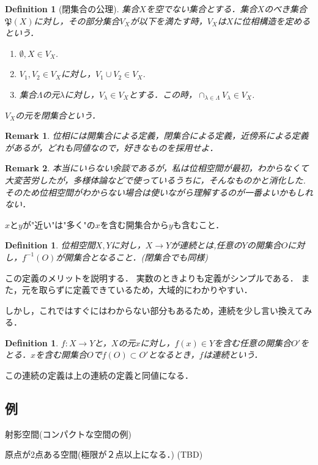 \documentclass{ujarticle}
\newtheorem{dfn}[thm]{Definition}
\newtheorem*{rem}{Remark}
\begin{document}
\begin{dfn}[閉集合の公理]
 集合$X$を空でない集合とする．集合$X$のべき集合$\mathfrak{P}(X)$に対し，その部分集合$V_X$が以下を満たす時，$V_X$は$X$に位相構造を定めるという．
 \begin{enumerate}
   \item $\emptyset , X \in V_X$.
   \item $V_1,V_2 \in V_X$に対し，$V_1 \cup V_2 \in V_X$.
   \item 集合$\Lambda$の元$\lambda$に対し，$V_{\lambda} \in V_X$とする．この時，$\displaystyle \cap_{\lambda \in \Lambda}V_{\lambda} \in V_X$.
 \end{enumerate}
 $V_X$の元を閉集合という．
\end{dfn}

\begin{rem}
位相には開集合による定義，閉集合による定義，近傍系による定義があるが，どれも同値なので，好きなものを採用せよ．
\end{rem}
\begin{rem}
 本当にいらない余談であるが，私は位相空間が最初，わからなくて大変苦労したが，多様体論などで使っているうちに，そんなものかと消化した.そのため位相空間がわからない場合は使いながら理解するのが一番よいかもしれない．
\end{rem}

$x$と$y$が"近い"は"多く"の$x$を含む開集合から$y$も含むこと．

\begin{dfn}
 位相空間$X,Y$に対し，$X \to Y$が連続とは,任意の$Y$の開集合$O$に対し，$f^{-1}(O)$が開集合となること．(閉集合でも同様)
\end{dfn}
この定義のメリットを説明する．
実数のときよりも定義がシンプルである．
また，元を取らずに定義できているため，大域的にわかりやすい．

しかし，これではすぐにはわからない部分もあるため，連続を少し言い換えてみる．
\begin{dfn}
 $f:X \to Y$と，$X$の元$x$に対し，$f(x) \in Y$を含む任意の開集合$O'$をとる．$x$を含む開集合$O$で$f(O) \subset O'$となるとき，$f$は連続という．
\end{dfn}
この連続の定義は上の連続の定義と同値になる．


\subsection{例}
\label{sub:例}

射影空間(コンパクトな空間の例)

原点が2点ある空間(極限が２点以上になる．)
(TBD)
\end{document}
